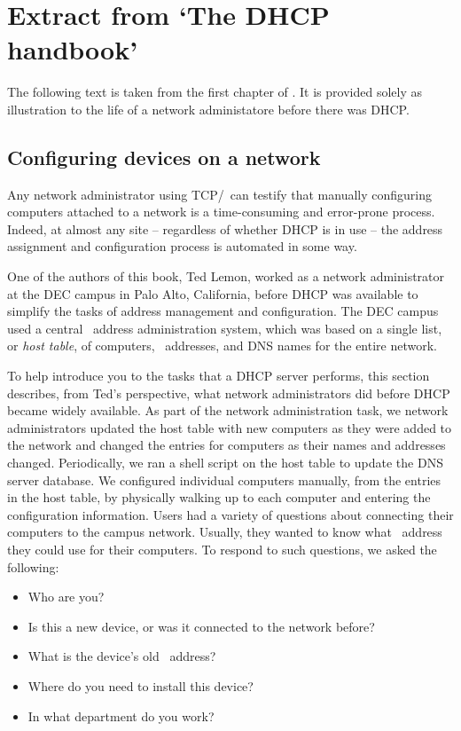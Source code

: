 \chapter{Extract from `The \acs{DHCP} handbook'}
\label{chap:dhcp-extract}

The following text is taken from the first chapter of \textcite{droms}.
It is provided solely as illustration to the life of a network administatore before there was \acs{DHCP}.

\section*{Configuring devices on a network}
Any network administrator using \acs{TCP}/\IP\ can testify that manually configuring computers attached to a network is a time-consuming and error-prone process.
Indeed, at almost any site -- regardless of whether \acs{DHCP} is in use -- the address assignment and configuration process is automated in some way.

One of the authors of this book, Ted Lemon, worked as a network administrator at the \acf{DEC} campus in Palo Alto, California, before \acs{DHCP} was available to simplify the tasks of address management and configuration.
The \acs{DEC} campus used a central \IP\ address administration system, which was based on a single list, or \emph{host table}, of computers, \IP\ addresses, and \acf{DNS} names for the entire network.

To help introduce you to the tasks that a \acs{DHCP} server performs, this section describes, from Ted's perspective, what network administrators did before \acs{DHCP} became widely available.
As part of the network administration task, we network administrators updated the host table with new computers as they were added to the network and changed the entries for computers as their names and addresses changed.
Periodically, we ran a shell script on the host table to update the \acs{DNS} server database.
We configured individual computers manually, from the entries in the host table, by physically walking up to each computer and entering the configuration information.
Users had a variety of questions about connecting their computers to the campus network.
Usually, they wanted to know what \IP\ address they could use for their computers.
To respond to such questions, we asked the following:
\begin{itemize}
\item
   Who are you?
\item
   Is this a new device, or was it connected to the network before?
\item
   What is the device's old \IP\ address?
\item
   Where do you need to install this device?
\item
   In what department do you work?
\end{itemize}

